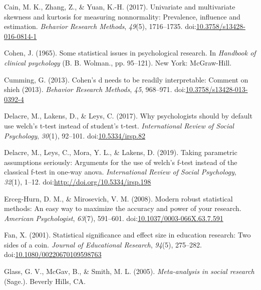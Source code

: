 \documentclass[man]{apa6}
\begin{document}
\leavevmode\hypertarget{ref-Cain_et_al_2017}{}%
Cain, M. K., Zhang, Z., \& Yuan, K.-H. (2017). Univariate and multivariate skewness and kurtosis for measuring nonnormality: Prevalence, influence and estimation. \emph{Behavior Research Methods}, \emph{49}(5), 1716--1735. doi:\href{https://doi.org/10.3758/s13428-016-0814-1}{10.3758/s13428-016-0814-1}

\leavevmode\hypertarget{ref-Cohen_1965}{}%
Cohen, J. (1965). Some statistical issues in psychological research. In \emph{Handbook of clinical psychology} (B. B. Wolman., pp. 95--121). New York: McGraw-Hill.

\leavevmode\hypertarget{ref-Cumming_2013}{}%
Cumming, G. (2013). Cohen's d needs to be readily interpretable: Comment on shieh (2013). \emph{Behavior Research Methods}, \emph{45}, 968--971. doi:\href{https://doi.org/10.3758/s13428-013-0392-4}{10.3758/s13428-013-0392-4}

\leavevmode\hypertarget{ref-Delacre_et_al_2017}{}%
Delacre, M., Lakens, D., \& Leys, C. (2017). Why psychologists should by default use welch's t-test instead of student's t-test. \emph{International Review of Social Psychology}, \emph{30}(1), 92--101. doi:\href{https://doi.org/10.5334/irsp.82}{10.5334/irsp.82}

\leavevmode\hypertarget{ref-Delacre_et_al_2019}{}%
Delacre, M., Leys, C., Mora, Y. L., \& Lakens, D. (2019). Taking parametric assumptions seriously: Arguments for the use of welch's f-test instead of the classical f-test in one-way anova. \emph{International Review of Social Psychology}, \emph{32}(1), 1--12. doi:\href{https://doi.org/http://doi.org/10.5334/irsp.198}{http://doi.org/10.5334/irsp.198}

\leavevmode\hypertarget{ref-Erceg-Hurn_Mirosevich_2008}{}%
Erceg-Hurn, D. M., \& Mirosevich, V. M. (2008). Modern robust statistical methods: An easy way to maximize the accuracy and power of your research. \emph{American Psychologist}, \emph{63}(7), 591--601. doi:\href{https://doi.org/10.1037/0003-066X.63.7.591}{10.1037/0003-066X.63.7.591}

\leavevmode\hypertarget{ref-Fan_2001}{}%
Fan, X. (2001). Statistical significance and effect size in education research: Two sides of a coin. \emph{Journal of Educational Research}, \emph{94}(5), 275--282. doi:\href{https://doi.org/10.1080/00220670109598763}{10.1080/00220670109598763}

\leavevmode\hypertarget{ref-Glass_et_al_1981}{}%
Glass, G. V., McGav, B., \& Smith, M. L. (2005). \emph{Meta-analysis in social research} (Sage.). Beverly Hills, CA.
\end{document}

